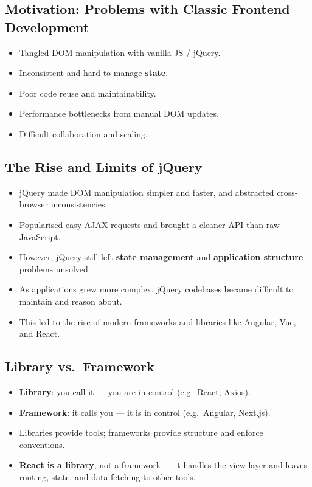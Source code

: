 \documentclass[hidelinks]{article}
\begin{document}
\subsection{Motivation: Problems with Classic Frontend Development}
\begin{itemize}
  \item Tangled DOM manipulation with vanilla JS / jQuery.
  \item Inconsistent and hard-to-manage \textbf{state}.
  \item Poor code reuse and maintainability.
  \item Performance bottlenecks from manual DOM updates.
  \item Difficult collaboration and scaling.
\end{itemize}

\subsection{The Rise and Limits of jQuery}
\begin{itemize}
  \item jQuery made DOM manipulation simpler and faster, and abstracted cross-browser inconsistencies.
  \item Popularised easy AJAX requests and brought a cleaner API than raw JavaScript.
  \item However, jQuery still left \textbf{state management} and \textbf{application structure} problems unsolved.
  \item As applications grew more complex, jQuery codebases became difficult to maintain and reason about.
  \item This led to the rise of modern frameworks and libraries like Angular, Vue, and React.
\end{itemize}

\subsection{Library vs.\ Framework}
\begin{itemize}
  \item \textbf{Library}: you call it --- you are in control (e.g.\ React, Axios).
  \item \textbf{Framework}: it calls you --- it is in control (e.g.\ Angular, Next.js).
  \item Libraries provide tools; frameworks provide structure and enforce conventions.
  \item \textbf{React is a library}, not a framework --- it handles the view layer and leaves routing, state, and data-fetching to other tools.
\end{itemize}
\end{document}
